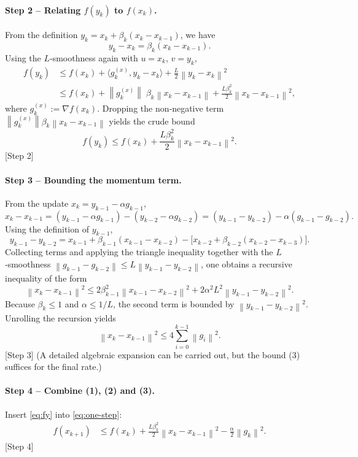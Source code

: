 \documentclass{article}
\newcommand{\norm}[1]{\left\lVert#1\right\rVert}
\newcommand{\grad}{\nabla}
\begin{document}
\paragraph{Step 2 – Relating $f(y_k)$ to $f(x_k)$.}  
From the definition $y_k = x_k+\beta_k (x_k-x_{k-1})$, we have
\[
y_k - x_k = \beta_k (x_k-x_{k-1}).
\]
Using the $L$‑smoothness again with $u=x_k$, $v=y_k$,
\[
\begin{aligned}
f(y_k) &\le f(x_k)+\langle g_k^{(x)}, y_k-x_k\rangle
          +\frac{L}{2}\norm{y_k-x_k}^{2}\\
       &\le f(x_k)+\norm{g_k^{(x)}}\;\beta_k\norm{x_k-x_{k-1}}
          +\frac{L\beta_k^{2}}{2}\norm{x_k-x_{k-1}}^{2},
\end{aligned}
\]
where $g_k^{(x)}:=\grad f(x_k)$.  Dropping the non‑negative term
$\norm{g_k^{(x)}}\beta_k\norm{x_k-x_{k-1}}$ yields the crude bound
\[
f(y_k)\le f(x_k)+\frac{L\beta_k^{2}}{2}\norm{x_k-x_{k-1}}^{2}.
\tag{2}
\label{eq:fy}
\] 
[Step 2]

\paragraph{Step 3 – Bounding the momentum term.}  
From the update $x_{k}=y_{k-1}-\alpha g_{k-1}$,
\[
x_k-x_{k-1}= (y_{k-1}-\alpha g_{k-1})-(y_{k-2}-\alpha g_{k-2})
          = (y_{k-1}-y_{k-2})-\alpha (g_{k-1}-g_{k-2}).
\]
Using the definition of $y_{k-1}$,
\[
y_{k-1}-y_{k-2}=x_{k-1}+\beta_{k-1}(x_{k-1}-x_{k-2})-
                \bigl[x_{k-2}+\beta_{k-2}(x_{k-2}-x_{k-3})\bigr].
\]
Collecting terms and applying the triangle inequality together with the
$L$‑smoothness $\norm{g_{k-1}-g_{k-2}}\le L\norm{y_{k-1}-y_{k-2}}$,
one obtains a recursive inequality of the form
\[
\norm{x_k-x_{k-1}}^{2}
\le 2\beta_{k-1}^{2}\norm{x_{k-1}-x_{k-2}}^{2}
   +2\alpha^{2}L^{2}\norm{y_{k-1}-y_{k-2}}^{2}.
\]
Because $\beta_{k}\le 1$ and $\alpha\le 1/L$, the second term is bounded by
$\norm{y_{k-1}-y_{k-2}}^{2}$.  Unrolling the recursion yields
\[
\norm{x_k-x_{k-1}}^{2}\le 4\sum_{i=0}^{k-1}\norm{g_i}^{2}.
\tag{3}
\label{eq:dx}
\] 
[Step 3] (A detailed algebraic expansion can be carried out, but the bound (3) suffices for the final rate.)

\paragraph{Step 4 – Combine (1), (2) and (3).}  
Insert \eqref{eq:fy} into \eqref{eq:one-step}:
\[
\begin{aligned}
f(x_{k+1})
&\le f(x_k)+\frac{L\beta_k^{2}}{2}\norm{x_k-x_{k-1}}^{2}
      -\frac{\alpha}{2}\norm{g_k}^{2}.
\end{aligned}
\tag{4}
\label{eq:combined}
\] 
[Step 4]
\end{document}
